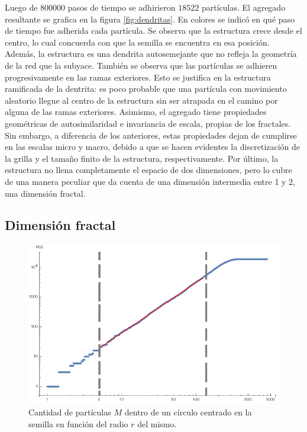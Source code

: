 \documentclass[aps,prb,twocolumn,superscriptaddress,floatfix,longbibliography]{revtex4-2}
\begin{document}
Luego de $800000$ pasos de tiempo se adhirieron $18522$ partículas. El agregado resultante se grafica en la figura \ref{fig:dendritas}. En colores se indicó en qué paso de tiempo fue adherida cada partícula. Se observa que la estructura crece desde el centro, lo cual concuerda con que la semilla se encuentra en esa posición. Además, la estructura es una dendrita autosemejante que no refleja la geometría de la red que la subyace. También se observa que las partículas se adhieren progresivamente en las ramas exteriores. Esto se justifica en la estructura ramificada de la dentrita: es poco probable que una partícula con movimiento aleatorio llegue al centro de la estructura sin ser atrapada en el camino por alguna de las ramas exteriores. Asimismo, el agregado tiene propiedades geométricas de autosimilaridad e invariancia de escala, propias de los fractales. Sin embargo, a diferencia de los anteriores, estas propiedades dejan de cumplirse en las escalas micro y macro, debido a que se hacen evidentes la discretización de la grilla y el tamaño finito de la estructura, respectivamente. Por último, la estructura no llena completamente el espacio de dos dimensiones, pero lo cubre de una manera peculiar que da cuenta de una dimensión intermedia entre 1 y 2, una dimensión fractal.

\subsection{Dimensión fractal}

\begin{figure}[h]
    \includegraphics[clip=true,width=\columnwidth]{M(r).png}
    \caption{Cantidad de partículas $M$ dentro de un círculo centrado en la semilla en función del radio $r$ del mismo.}
     \label{fig:M(r)}
\end{figure}
\end{document}
